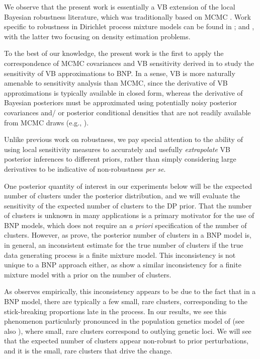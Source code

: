 We observe that the present work is essentially a
VB extension of the local Bayesian robustness literature, which was
traditionally based on MCMC
\citep{gustafson:1996:local, basu:1996:local}.
Work specific to robustness in Dirichlet process mixture models can be found in
\citet{Basu:2000:robustnessBNP, barajas:2009:densitysens}; and \citet{saha:2019:geometricsens},
with the latter two focusing on density estimation problems.

To the best of our knowledge, the present work is the first to apply the
correspondence of MCMC covariances and VB sensitivity derived in
\citep{giordano:2018:covariances} to study the sensitivity of VB approximations to BNP.
In a sense, VB is more naturally
amenable to sensitivity analysis than MCMC, since the derivative of VB
approximations is typically available in closed form, whereas the derivative of
Bayesian posteriors must be approximated using potentially noisy posterior
covariances and/ or posterior conditional densities that are not readily
available from MCMC draws (e.g., \citet{gustafson:1996:marginal}).

Unlike previous work on robustness, we pay
special attention to the ability of using local sensitivity measures
to accurately and usefully \textit{extrapolate}
VB posterior inferences to different priors, rather than simply considering
large derivatives to be indicative of non-robustness \textit{per se}.

One posterior quantity of interest in our experiments below will be
the expected number of clusters under the posterior distribution,
and we will evaluate the sensitivity of the expected number of clusters
to the DP prior.
That the number of clusters is unknown in many applications
is a primary motivator for the use of BNP models, which does not
require an \textit{a priori} specification of the number of clusters.
However, as \citet{miller:2013:neurips, miller:14:inconsistency} prove,
the posterior number of clusters in a BNP model is,
in general, an inconsistent estimate for the true number of clusters if the
true data generating process is a finite mixture model.
This inconsistency is not unique to a BNP approach either, as
\citet{cai:2020:finite, cai:2020:power} show
a similar inconsistency for a finite mixture model with a prior on the number
of clusters.

As \citet{miller:14:inconsistency} observes empirically,
this inconsistency appears to be due to the fact
that in a BNP model, there are typically a few small, rare clusters,
corresponding to the stick-breaking proportions late in the process.
In our results, we see this phenomenon particularly pronounced in
the population genetics model of 
(see also ),
where small, rare clusters correspond to outlying genetic loci.
We will see that the expected number of clusters appear non-robust to prior
perturbations, and it is the small, rare clusters that drive
the change.

